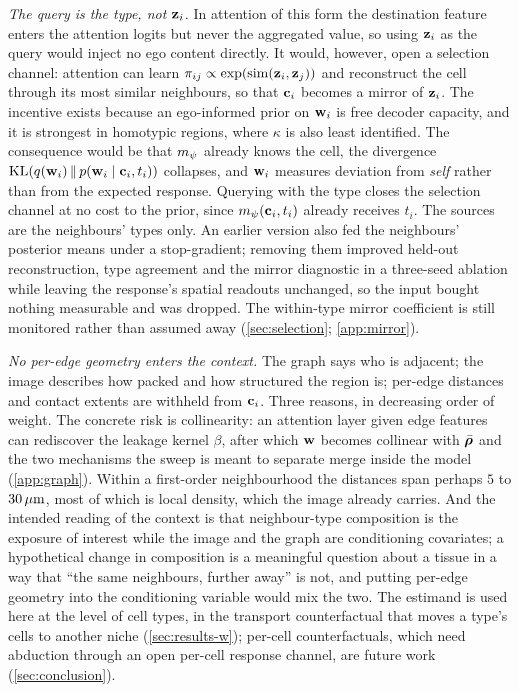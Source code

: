  \emph{The query is the type, not $\mathbf{z}_i$.} In attention of this form the destination feature enters the attention logits but never the aggregated value, so using $\mathbf{z}_i$ as the query would inject no ego content directly. It would, however, open a selection channel: attention can learn $\pi_{ij} \propto \exp(\operatorname{sim}(\mathbf{z}_i, \mathbf{z}_j))$ and reconstruct the cell through its most similar neighbours, so that $\mathbf{c}_i$ becomes a mirror of $\mathbf{z}_i$. The incentive exists because an ego-informed prior on $\mathbf{w}_i$ is free decoder capacity, and it is strongest in homotypic regions, where $\kappa$ is also least identified. The consequence would be that $m_{\psi}$ already knows the cell, the divergence $\operatorname{KL}(q(\mathbf{w}_i)\,\|\,p(\mathbf{w}_i \mid \mathbf{c}_i, t_i))$ collapses, and $\mathbf{w}_i$ measures deviation from \emph{self} rather than from the expected response. Querying with the type closes the selection channel at no cost to the prior, since $m_{\psi}(\mathbf{c}_i, t_i)$ already receives $t_i$. The sources are the neighbours' types only. An earlier version also fed the neighbours' posterior means under a stop-gradient; removing them improved held-out reconstruction, type agreement and the mirror diagnostic in a three-seed ablation while leaving the response's spatial readouts unchanged, so the input bought nothing measurable and was dropped. The within-type mirror coefficient is still monitored rather than assumed away (\cref{sec:selection}; \cref{app:mirror}).

 \emph{No per-edge geometry enters the context.} The graph says who is adjacent; the image describes how packed and how structured the region is; per-edge distances and contact extents are withheld from $\mathbf{c}_i$. Three reasons, in decreasing order of weight. The concrete risk is collinearity: an attention layer given edge features can rediscover the leakage kernel $\beta$, after which $\mathbf{w}$ becomes collinear with $\bar{\boldsymbol{\rho}}$ and the two mechanisms the sweep is meant to separate merge inside the model (\cref{app:graph}). Within a first-order neighbourhood the distances span perhaps $5$ to $30\,\mu\text{m}$, most of which is local density, which the image already carries. And the intended reading of the context is that neighbour-type composition is the exposure of interest while the image and the graph are conditioning covariates; a hypothetical change in composition is a meaningful question about a tissue in a way that ``the same neighbours, further away'' is not, and putting per-edge geometry into the conditioning variable would mix the two. The estimand is used here at the level of cell types, in the transport counterfactual that moves a type's cells to another niche (\cref{sec:results-w}); per-cell counterfactuals, which need abduction through an open per-cell response channel, are future work (\cref{sec:conclusion}).

